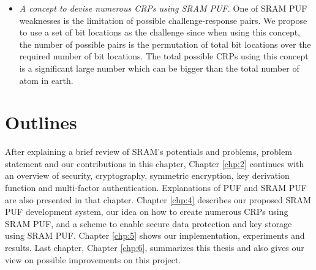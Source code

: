 \begin{itemize}
    \item \textit{A concept to devise numerous CRPs using SRAM PUF.} One of SRAM PUF weaknesses is the limitation of possible challenge-response pairs. We propose to use a set of bit locations as the challenge since when using this concept, the number of possible pairs is the permutation of total bit locations over the required number of bit locations. The total possible CRPs using this concept is a significant large number which can be bigger than the total number of atom in earth.
\end{itemize}


\section{Outlines}
After explaining a brief review of SRAM's potentials and problems, problem statement and our contributions in this chapter,
Chapter \ref{chp:2} continues with an overview of security, cryptography, symmetric encryption, key derivation function and multi-factor authentication. Explanations of PUF and SRAM PUF are also presented in that chapter. Chapter \ref{chp:4} describes our proposed SRAM PUF development system, our idea on how to create numerous CRPs using SRAM PUF, and a scheme to enable secure data protection and key storage using SRAM PUF. Chapter \ref{chp:5} shows our implementation, experiments and results. Last chapter, Chapter \ref{chp:6}, summarizes this thesis and also gives our view on possible improvements on this project.

